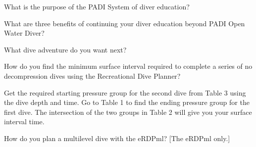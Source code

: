 	\begin{qanda}
		\begin{question}
What is the purpose of the PADI System of diver education?
		\end{question}

		\begin{answer}

		\end{answer}
	\end{qanda}

	\begin{qanda}
		\begin{question}
What are three benefits of continuing your diver education beyond PADI Open Water Diver?
		\end{question}

		\begin{answer}

		\end{answer}
	\end{qanda}

	\begin{qanda}
		\begin{question}
What dive adventure do you want next?
		\end{question}

		\begin{answer}

		\end{answer}
	\end{qanda}

	\begin{qanda}
		\begin{question}
How do you find the minimum surface interval required to complete a series of no decompression dives using the Recreational Dive Planner?
		\end{question}

		\begin{answer}
Get the required starting pressure group for the second dive from Table 3 using the dive depth and time.  Go to Table 1 to find the ending pressure group for the first dive.  The intersection of the two groups in Table 2 will give you your surface interval time.
		\end{answer}
	\end{qanda}

	\begin{qanda}
		\begin{question}
How do you plan a multilevel dive with the eRDPml? [The eRDPml only.]
		\end{question}

		\begin{answer}

		\end{answer}
	\end{qanda} 